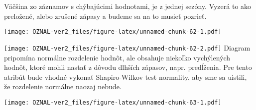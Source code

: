 \documentclass[
]{article}
\newenvironment{Shaded}{\begin{snugshade}}{\end{snugshade}}
\newcommand{\AttributeTok}[1]{\textcolor[rgb]{0.77,0.63,0.00}{#1}}
\newcommand{\FunctionTok}[1]{\textcolor[rgb]{0.00,0.00,0.00}{#1}}
\newcommand{\NormalTok}[1]{#1}
\newcommand{\SpecialCharTok}[1]{\textcolor[rgb]{0.00,0.00,0.00}{#1}}
\newcommand{\StringTok}[1]{\textcolor[rgb]{0.31,0.60,0.02}{#1}}
\begin{document}
Väčšina zo záznamov s chýbajúcimi hodnotami, je z jednej sezóny. Vyzerá
to ako preložené, alebo zrušené zápasy a budeme sa na to musieť pozrieť.

\begin{Shaded}
\end{Shaded}

\texttt{[image: OZNAL-ver2\_files/figure-latex/unnamed-chunk-62-1.pdf]}

\begin{Shaded}
\end{Shaded}

\texttt{[image: OZNAL-ver2\_files/figure-latex/unnamed-chunk-62-2.pdf]}
Diagram pripomína normálne rozdelenie hodnôt, ale obsahuje niekoľko
vychýlených hodnôt, ktoré mohli nastať z dôvodu dlhších zápasov, napr.
predĺženia. Pre tento atribút bude vhodné vykonať Shapiro-Wilkov test
normality, aby sme sa uistili, že rozdelenie normálne naozaj nebude.

\begin{Shaded}
\end{Shaded}

\texttt{[image: OZNAL-ver2\_files/figure-latex/unnamed-chunk-63-1.pdf]}

\begin{Shaded}
\end{Shaded}
\end{document}
